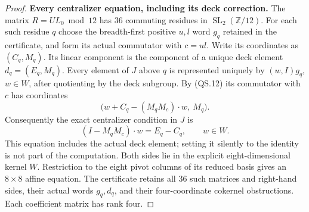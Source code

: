 \begin{proof}
\textbf{Every centralizer equation, including its deck correction.}
The matrix $R=UL_0\bmod12$ has $36$ commuting residues in
$\operatorname{SL}_2(\mathbb Z/12)$.  For each such residue $q$
choose the breadth-first positive $u,l$ word $g_q$ retained in
the certificate, and form its actual commutator with $c=ul$.
Write its coordinates as $(C_q,M_q)$.  Its linear component
is the component of a unique deck element $d_q=(E_q,M_q)$.
Every element of $J$ above $q$ is represented uniquely by
$(w,I)g_q$, $w\in W$, after quotienting by the deck subgroup.
By (QS.12) its commutator with $c$ has coordinates
\[
 \bigl(w+C_q-(M_qM_c)\cdot w,\ M_q\bigr).
\]
Consequently the exact centralizer condition in $J$ is
\[
 (I-M_qM_c)\cdot w=E_q-C_q,
       \qquad w\in W.                                  \tag{QS.15}
\]
This equation includes the actual deck element; setting it
silently to the identity is not part of the computation.
Both sides lie in the explicit eight-dimensional kernel
$W$.  Restriction to the eight pivot columns of its reduced
basis gives an $8\times8$ affine equation.  The certificate
retains all $36$ such matrices and right-hand sides, their
actual words $g_q,d_q$, and their four-coordinate cokernel
obstructions.  Each coefficient matrix has rank four.


\end{proof}
